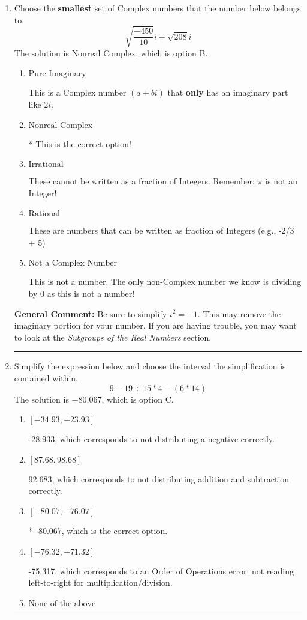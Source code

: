 \documentclass{extbook}[14pt]
\newcommand{\litem}[1]{\item #1

\rule{\textwidth}{0.4pt}}
\begin{document}
\begin{enumerate}
{ Irrational numbers are more than just square root of 3: adding or subtracting values from square root of 3 is also irrational.
}
\litem{
Choose the \textbf{smallest} set of Complex numbers that the number below belongs to.
\[ \sqrt{\frac{-450}{10}} i+\sqrt{208}i \]The solution is \( \text{Nonreal Complex} \), which is option B.\begin{enumerate}[label=\Alph*.]
\item \( \text{Pure Imaginary} \)

This is a Complex number $(a+bi)$ that \textbf{only} has an imaginary part like $2i$.
\item \( \text{Nonreal Complex} \)

* This is the correct option!
\item \( \text{Irrational} \)

These cannot be written as a fraction of Integers. Remember: $\pi$ is not an Integer!
\item \( \text{Rational} \)

These are numbers that can be written as fraction of Integers (e.g., -2/3 + 5)
\item \( \text{Not a Complex Number} \)

This is not a number. The only non-Complex number we know is dividing by 0 as this is not a number!
\end{enumerate}

\textbf{General Comment:} Be sure to simplify $i^2 = -1$. This may remove the imaginary portion for your number. If you are having trouble, you may want to look at the \textit{Subgroups of the Real Numbers} section.
}
\litem{
Simplify the expression below and choose the interval the simplification is contained within.
\[ 9 - 19 \div 15 * 4 - (6 * 14) \]The solution is \( -80.067 \), which is option C.\begin{enumerate}[label=\Alph*.]
\item \( [-34.93, -23.93] \)

 -28.933, which corresponds to not distributing a negative correctly.
\item \( [87.68, 98.68] \)

 92.683, which corresponds to not distributing addition and subtraction correctly.
\item \( [-80.07, -76.07] \)

* -80.067, which is the correct option.
\item \( [-76.32, -71.32] \)

 -75.317, which corresponds to an Order of Operations error: not reading left-to-right for multiplication/division.
\item \( \text{None of the above} \)


\end{enumerate}}
\end{enumerate}
\end{document}
